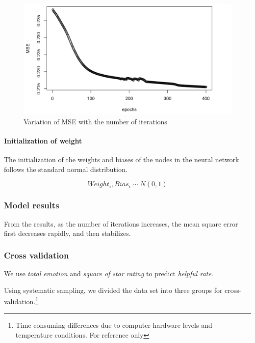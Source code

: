 \documentclass[12pt,a4paper,]{article}
\let\oldparagraph\paragraph
\renewcommand{\paragraph}[1]{\oldparagraph{#1}\mbox{}}
\let\rmarkdownfootnote\footnote%
\def\footnote{\protect\rmarkdownfootnote}
\begin{document}
\begin{figure}

{\centering \includegraphics[width=0.6\linewidth]{Variation of MSE with the number of iterations} 

}

\caption{Variation of MSE with the number of iterations}\label{fig:unnamed-chunk-17}
\end{figure}

\hypertarget{initialization-of-weight}{%
\paragraph{Initialization of weight}\label{initialization-of-weight}}

The initialization of the weights and biases of the nodes in the neural
network follows the standard normal distribution.

\begin{equation}
Weight_i,Bias_i \sim N(0,1)
\end{equation}

\hypertarget{model-results}{%
\subsubsection{Model results}\label{model-results}}

From the results, as the number of iterations increases, the mean square
error first decreases rapidly, and then stabilizes.

\hypertarget{cross-validation}{%
\subsubsection{Cross validation}\label{cross-validation}}

We use \emph{total emotion} and \emph{square of star rating} to predict
\emph{helpful rate}.

Using systematic sampling, we divided the data set into three groups for
cross-validation.\footnote{Time consuming differences due to computer
  hardware levels and temperature conditions. For reference only}
\end{document}
